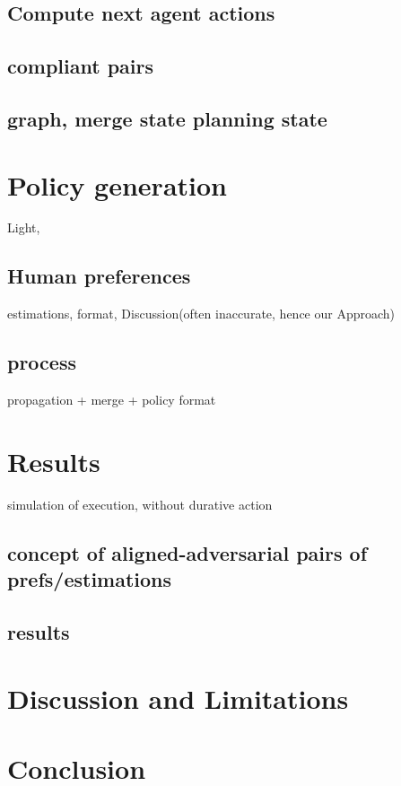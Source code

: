 \subsection{Compute next agent actions}

\subsection{compliant pairs}

\subsection{graph, merge state planning state}


\section{Policy generation}
Light, 

\subsection{Human preferences}
estimations, format, Discussion(often inaccurate, hence our Approach)

\subsection{process}
propagation + merge + policy format 

\section{Results}
simulation of execution, without durative action

\subsection{concept of aligned-adversarial pairs of prefs/estimations}

\subsection{results}

\section{Discussion and Limitations}
\section{Conclusion}




